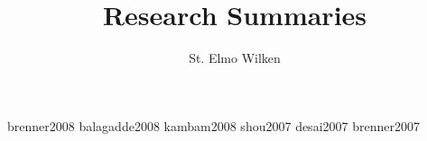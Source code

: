 \documentclass[11pt,fleqn]{article}
\begin{document}
\title{Research Summaries}
\author{St. Elmo Wilken}
\maketitle

{brenner2008}
{balagadde2008}
{kambam2008}
{shou2007}
{desai2007}
{brenner2007}




\end{document}
